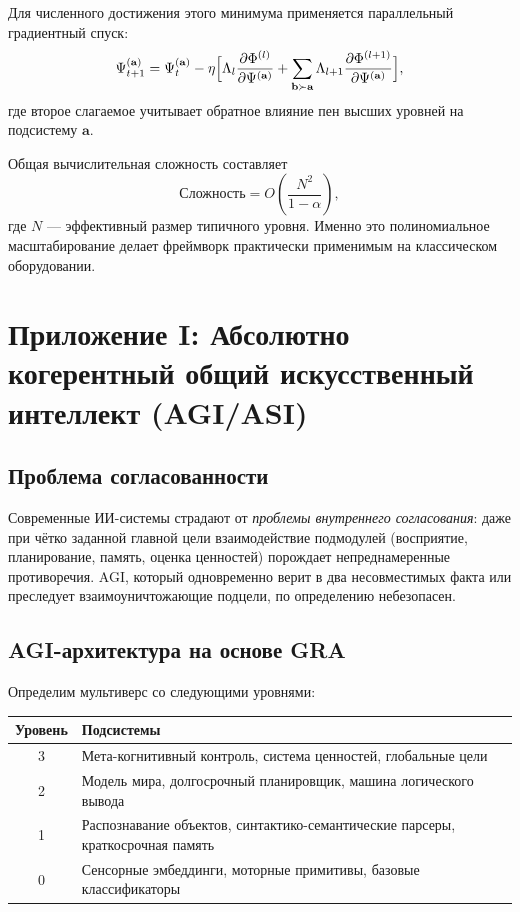 \documentclass[11pt,a4paper]{article}
\theoremstyle{definition}
\newcommand{\Foam}{\Phi}
\begin{document}
Для численного достижения этого минимума применяется параллельный градиентный спуск:
\begin{equation}\label{eq:gradstep}
\Psi^{(\mathbf{a})}_{t+1} = \Psi^{(\mathbf{a})}_t - \eta \Bigl[ \Lambda_l \frac{\partial \Foam^{(l)}}{\partial \Psi^{(\mathbf{a})}} + \sum_{\mathbf{b}\succ\mathbf{a}} \Lambda_{l+1} \frac{\partial \Foam^{(l+1)}}{\partial \Psi^{(\mathbf{a})}} \Bigr],
\end{equation}
где второе слагаемое учитывает обратное влияние пен высших уровней на подсистему $\mathbf{a}$.

Общая вычислительная сложность составляет
\begin{equation}\label{eq:complexity}
\text{Сложность} = O\!\left( \frac{N^2}{1-\alpha} \right),
\end{equation}
где $N$ — эффективный размер типичного уровня. Именно это полиномиальное масштабирование делает фреймворк практически применимым на классическом оборудовании.

\section{Приложение I: Абсолютно когерентный общий искусственный интеллект (AGI/ASI)}

\subsection{Проблема согласованности}

Современные ИИ-системы страдают от \emph{проблемы внутреннего согласования}: даже при чётко заданной главной цели взаимодействие подмодулей (восприятие, планирование, память, оценка ценностей) порождает непреднамеренные противоречия. AGI, который одновременно верит в два несовместимых факта или преследует взаимоуничтожающие подцели, по определению небезопасен.

\subsection{AGI-архитектура на основе GRA}

Определим мультиверс со следующими уровнями:
\begin{center}
\begin{tabular}{c|l}
Уровень & Подсистемы \\ \hline
3 & Мета-когнитивный контроль, система ценностей, глобальные цели \\
2 & Модель мира, долгосрочный планировщик, машина логического вывода \\
1 & Распознавание объектов, синтактико-семантические парсеры, краткосрочная память \\
0 & Сенсорные эмбеддинги, моторные примитивы, базовые классификаторы
\end{tabular}
\end{center}
\end{document}
